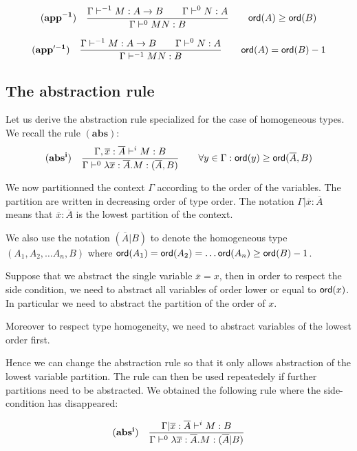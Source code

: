 $$ \mathbf{(app^{-1})} \quad  \frac{\displaystyle \Gamma \vdash^{-1} M : A\rightarrow B
                                        \qquad \Gamma \vdash^0 N : A}{\Gamma  \vdash^0 M N : B}
                                    \qquad {\sf ord}(A) \geq {\sf ord}(B)$$

$$ \mathbf{(app'^{-1})} \quad  \frac{\displaystyle \Gamma \vdash^{-1} M : A\rightarrow B
                                        \qquad \Gamma \vdash^0 N : A}{\Gamma  \vdash^{-1} M N : B}
                                    \qquad {\sf ord}(A) = {\sf ord}(B) - 1$$


\subsection{The abstraction rule}

Let us derive the abstraction rule specialized for the case of
homogeneous types. We recall the rule $\mathbf{(abs)}$:
$$ \mathbf{(abs^i)} \quad  \frac{\displaystyle \Gamma, \overline{x} : \overline{A} \vdash^{i} M : B}{\Gamma  \vdash^{0} \lambda \overline{x} : \overline{A} . M : (\overline{A},B)} \qquad
                                   \forall y \in \Gamma : {\sf ord}(y) \geq {\sf ord}(\overline{A},B)$$

We now partitionned the context $\Gamma$ according to the order of
the variables. The partition are written in decreasing order of type
order. The notation $\Gamma | \overline{x}:\overline{A}$ means that
$\overline{x}:\overline{A}$ is the lowest partition of the context.

We also use the notation $(\overline{A}|B)$ to denote the
homogeneous type $(A_1, A_2, \ldots A_n, B)$ where ${\sf ord}(A_1) =
{\sf ord}(A_2) =  \ldots {\sf ord}(A_n) \geq {\sf ord}(B) -1$.


Suppose that we abstract the single variable $\overline{x} = x$,
then in order to respect the side condition, we need to abstract all
variables of order lower or equal to ${\sf ord}(x)$. In particular we
need to abstract the partition of the order of $x$.

Moreover to respect type homogeneity, we need to abstract variables
of the lowest order first.

Hence we can change the abstraction rule so that it only allows
abstraction of the lowest variable partition. The rule can then be
used repeatedely if further partitions need to be abstracted. We
obtained the following rule where the side-condition has
disappeared:

$$ \mathbf{(abs^i)} \quad  \frac{\displaystyle \Gamma| \overline{x} : \overline{A} \vdash^{i} M : B}{\Gamma  \vdash^{0} \lambda \overline{x} : \overline{A} . M : (\overline{A}|B)}$$


